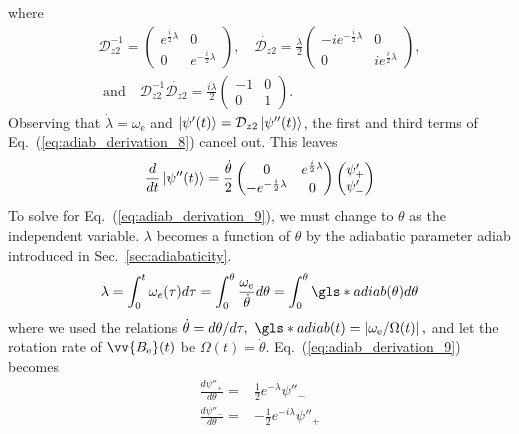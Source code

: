%
where
%
\begin{gather}
    \mathcal{{D}}_{z2}^{-1}=\left(\begin{matrix}
    e^{\frac{i}{2}\lambda} & 0\\
    0 & e^{-\frac{i}{2}\lambda}
    \end{matrix}\right),\quad\dot{\mathcal{{D}}_{z2}}=\frac{\dot{\lambda}}{2}\left(\begin{matrix}
    -ie^{-\frac{i}{2}\lambda} & 0\\
    0 & ie^{\frac{i}{2}\lambda}
    \end{matrix}\right),\nonumber\\
    \text{ and} \quad \mathcal{{D}}_{z2}^{-1}\dot{\mathcal{{D}}_{z2}}=\frac{i\dot{\lambda}}{2}\left(\begin{matrix}
    -1 & 0\\
    0 & 1
    \end{matrix}\right).\nonumber
\end{gather}
%
Observing that $\dot{\lambda}=\omega_\text{e}$ and $\Ket{\psi'(t)}=\mathcal{{D}}_{z2}\Ket{\psi''(t)}$, the first and third terms of Eq.~(\ref{eq:adiab_derivation_8}) cancel out. This leaves
%
\begin{gather}
    \frac{d}{dt}\Ket{\psi''(t)}=\frac{\dot{\theta}}{2}\left(\begin{matrix}
    0 & e^{\frac{i}{2}\lambda}\\
    -e^{-\frac{i}{2}\lambda} & 0
    \end{matrix}\right)\left(\begin{matrix}
    \psi'_{+}\\
    \psi'_{-}
    \end{matrix}\right)\label{eq:adiab_derivation_9}
\end{gather}
%
To solve for Eq.~(\ref{eq:adiab_derivation_9}), we must change to $\theta$ as the independent variable. $\lambda$ becomes a function of $\theta$ by the adiabatic parameter \gls{adiab} introduced in Sec.~\ref{sec:adiabaticity}. 
%
\begin{gather}
\lambda =\int_{0}^{t}\omega_{e}(\tau)d\tau
 =\int_{0}^{\theta}\frac{\omega_{e}}{\dot{\theta}}d\theta
 =\int_{0}^{\theta}\gls*{adiab}(\theta)d\theta
 \label{eq:adiab_derivation_10}
\end{gather}
%
where we used the relations $\dot{\theta}=d\theta/d\tau,\,\,\gls*{adiab}(t)=\left|\omega_\text{e}/\Omega(t)\right|,$ and let the rotation rate of $\vv{B_\text{e}}(t)$ be $\Omega(t)=\dot{\theta}$. Eq.~(\ref{eq:adiab_derivation_9}) becomes
%
\begin{align}
\frac{d\psi''_{+}}{d\theta}= & \frac{1}{2}e^{-\lambda}\psi''_{-}
\label{eq:adiab_derivation_11}\\
\frac{d\psi''_{-}}{d\theta}= & -\frac{1}{2}e^{-i\lambda}\psi''_{+}
\label{eq:adiab_derivation_12}
\end{align}
